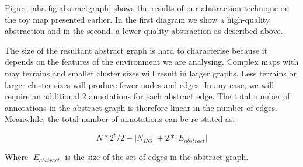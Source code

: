Figure \ref{aha-fig:abstractgraph} shows the results of our abstraction technique on the toy map presented earlier. In the first diagram we show a high-quality abstraction and in the second, a lower-quality abstraction as described above.\\ \newline

The size of the resultant abstract graph is hard to characterise because it depends on the features of the environment we are analysing. Complex maps with may terrains and smaller cluster sizes will result in larger graphs. Less terrains or larger cluster sizes will produce fewer nodes and edges. In any case, we will require an additional 2 annotations for each abstract edge. The total number of annotations in the abstract graph is therefore linear in the number of edges. Meanwhile, the total number of annotations can be re-stated as: 

\begin{equation}
N*2^t/2 - |N_{HO}| + 2*|E_{abstract}|
\label{aha-eq:totalannotations}
\end{equation}

Where $|E_{abstract}|$ is the size of the set of edges in the abstract graph.

